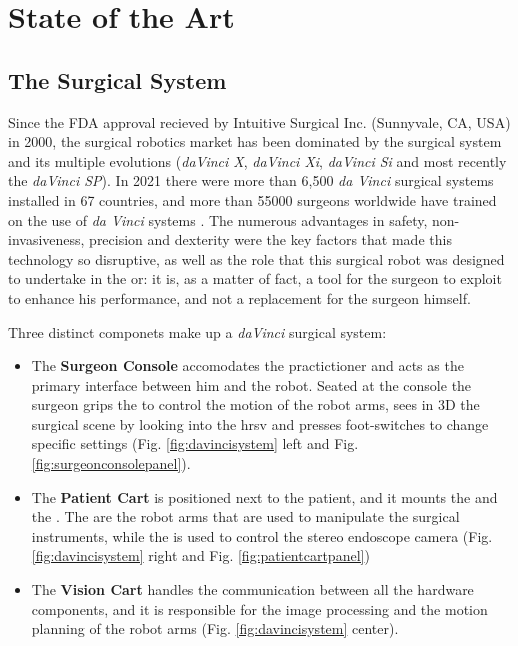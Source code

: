 \documentclass[../main.tex]{subfiles}
\begin{document}
\chapter{State of the Art}

\section{The \davinci Surgical System}
Since the FDA approval recieved by Intuitive Surgical Inc. (Sunnyvale, CA, USA) in 2000, the surgical robotics market has been dominated by the \davinci surgical system and its multiple evolutions (\textit{daVinci X}, \textit{daVinci Xi}, \textit{daVinci Si} and most recently the \textit{daVinci SP}). In 2021 there were more than 6,500 \textit{da Vinci} surgical systems installed in 67 countries, and more than 55000 surgeons worldwide have trained on the use of \textit{da Vinci} systems \cite{Intuitive2021}. The numerous advantages in safety, non-invasiveness, precision and dexterity were the key factors that made this technology so disruptive, as well as the role that this surgical robot was designed to undertake in the \ac{or}: it is, as a matter of fact, a tool for the surgeon to exploit to enhance his performance, and not a replacement for the surgeon himself.

Three distinct componets make up a \textit{daVinci} surgical system:
\begin{itemize}
   \item The \textbf{Surgeon Console} accomodates the practictioner and acts as the primary interface between him and the robot. Seated at the console the surgeon grips the \mtms to control the motion of the robot arms, sees in 3D the surgical scene by looking into the \ac{hrsv} and presses foot-switches to change specific settings (Fig. \ref{fig:davincisystem} left and Fig. \ref{fig:surgeonconsolepanel}).
    \item The \textbf{Patient Cart} is positioned next to the patient, and it mounts the \psms and the \ecm. The \psms are the robot arms that are used to manipulate the surgical instruments, while the \ecm is used to control the stereo endoscope camera (Fig. \ref{fig:davincisystem} right and Fig. \ref{fig:patientcartpanel})
    \item The \textbf{Vision Cart} handles the communication between all the hardware components, and it is responsible for the image processing and the motion planning of the robot arms (Fig. \ref{fig:davincisystem} center).
\end{itemize}
\end{document}
